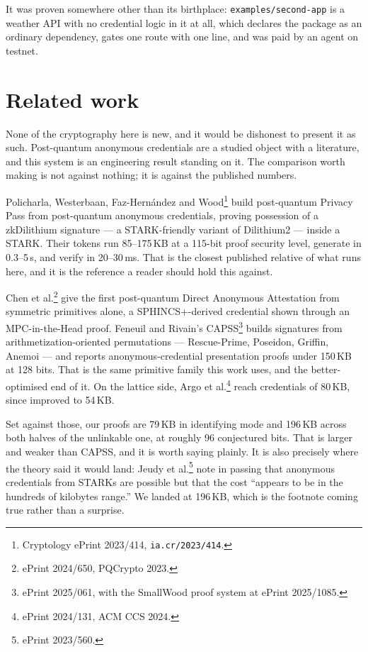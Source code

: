 \documentclass[11pt,a4paper]{article}
\begin{document}
It was proven somewhere other than its birthplace: \texttt{examples/second-app}
is a weather API with no credential logic in it at all, which declares the
package as an ordinary dependency, gates one route with one line, and was paid
by an agent on testnet.

\section{Related work}

None of the cryptography here is new, and it would be dishonest to present it
as such. Post-quantum anonymous credentials are a studied object with a
literature, and this system is an engineering result standing on it. The
comparison worth making is not against nothing; it is against the published
numbers.

Policharla, Westerbaan, Faz-Hern\'andez and Wood\footnote{Cryptology ePrint
2023/414, \texttt{ia.cr/2023/414}.} build post-quantum Privacy Pass from
post-quantum anonymous credentials, proving possession of a zkDilithium
signature --- a STARK-friendly variant of Dilithium2 --- inside a STARK. Their
tokens run 85--175\,KB at a 115-bit proof security level, generate in
0.3--5\,s, and verify in 20--30\,ms. That is the closest published relative of
what runs here, and it is the reference a reader should hold this against.

Chen et al.\footnote{ePrint 2024/650, PQCrypto 2023.} give the first
post-quantum Direct Anonymous Attestation from symmetric primitives alone, a
SPHINCS+-derived credential shown through an MPC-in-the-Head proof. Feneuil and
Rivain's CAPSS\footnote{ePrint 2025/061, with the SmallWood proof system at
ePrint 2025/1085.} builds signatures from arithmetization-oriented permutations
--- Rescue-Prime, Poseidon, Griffin, Anemoi --- and reports anonymous-credential
presentation proofs under 150\,KB at 128 bits. That is the same primitive family
this work uses, and the better-optimised end of it. On the lattice side, Argo et
al.\footnote{ePrint 2024/131, ACM CCS 2024.} reach credentials of 80\,KB, since
improved to 54\,KB.

Set against those, our proofs are 79\,KB in identifying mode and 196\,KB across
both halves of the unlinkable one, at roughly 96 conjectured bits. That is
larger and weaker than CAPSS, and it is worth saying plainly. It is also
precisely where the theory said it would land: Jeudy et al.\footnote{ePrint
2023/560.} note in passing that anonymous credentials from STARKs are possible
but that the cost ``appears to be in the hundreds of kilobytes range.'' We
landed at 196\,KB, which is the footnote coming true rather than a surprise.
\end{document}
